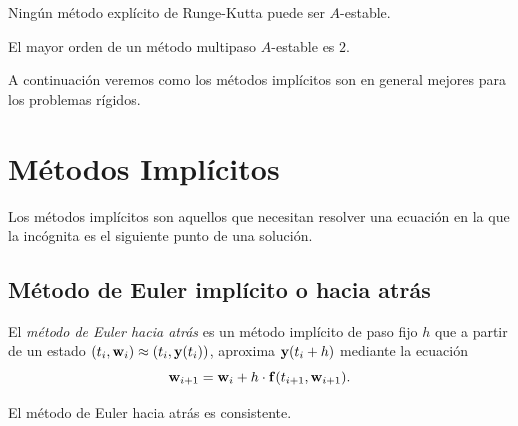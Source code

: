 
\begin{theorem}
    Ningún método explícito de Runge-Kutta puede ser $A$-estable.
\end{theorem}


\begin{theorem}
    El mayor orden de un método multipaso $A$-estable es $2$.
\end{theorem}

A continuación veremos como los métodos implícitos son en general
mejores para los problemas rígidos.

\section{Métodos Implícitos}

Los métodos implícitos son aquellos que
necesitan resolver una ecuación en la que la incógnita
es el siguiente punto de una solución.

\subsection{Método de Euler implícito o hacia atrás}

\begin{method}
    El \emph{método de Euler hacia atrás}
    es un método implícito de paso fijo $h$ que
    a partir de un estado $(t_i, \vb{w}{}_i) \approx (t_i, \vb{y}{}(t_i))$,
    aproxima $\vb{y}{}(t_i + h)$ mediante la ecuación
    \begin{equation}\label{eqn:backwardseulersol}
        \vb{w}{}_{i+1} = \vb{w}{}_i + h\cdot \vb{f}{}(t_{i+1}, \vb{w}{}_{i+1}).
    \end{equation}
\end{method}


\begin{proposition}
    El método de Euler hacia atrás es consistente.
\end{proposition}

